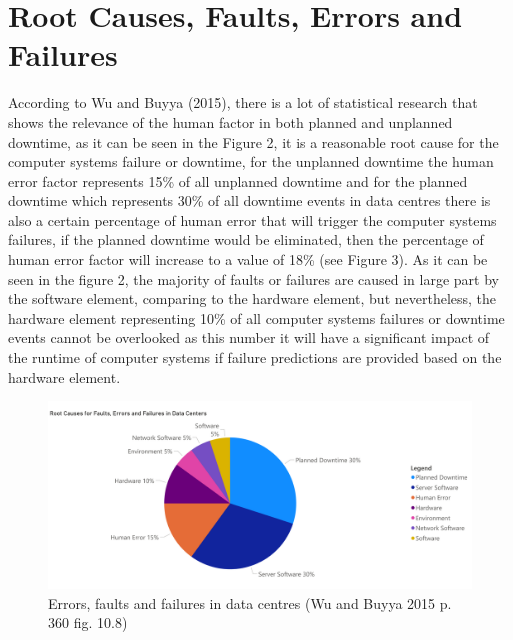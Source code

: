 \section{Root Causes, Faults, Errors and Failures}

According to Wu and Buyya (2015), there is a lot of statistical research that shows the relevance of the human factor
in both planned and unplanned downtime, as it can be seen in the Figure 2, it is a reasonable root cause for the
computer systems failure or downtime, for the unplanned downtime the human error factor represents 15\%
of all unplanned downtime and for the planned downtime which represents 30\% of all downtime events in data
centres there is also a certain percentage of human error that will trigger the computer systems failures,
if the planned downtime would be eliminated, then the percentage of human error factor will increase to a value
of 18\% (see Figure 3). As it can be seen in the figure 2, the majority of faults or failures are caused in
large part by the software element, comparing to the hardware element, but nevertheless, the hardware element
representing 10\% of all computer systems failures or downtime events cannot be overlooked as this number it
will have a significant impact of the runtime of computer systems if failure predictions are provided based
on the hardware element.

\newpage

\begin{figure}[h]
    \centering
    \includegraphics[width=\textwidth]{images/downtime.pdf}
    \captionsetup{justification=centering}
    \caption[Errors, faults and failures in data centres]{Errors, faults and failures in data centres
    (Wu and Buyya 2015 p. 360 fig. 10.8)}
    \label{fig:downtime-events}
\end{figure}

